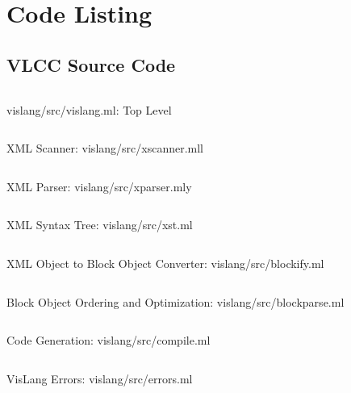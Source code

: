 \appendix
\section{Code Listing}
\subsection{VLCC Source Code}

\inputminted[frame=single,linenos,fontsize=\footnotesize]{ocaml}{../src/vislang.ml}
    {vislang/src/vislang.ml\label{src:top}: Top Level}

\inputminted[frame=single,linenos,fontsize=\footnotesize]{ocaml}{../src/xscanner.mll}
    {XML Scanner: vislang/src/xscanner.mll\label{src:scan}}

\inputminted[frame=single,linenos,fontsize=\footnotesize]{ocaml}{../src/xparser.mly}
    {XML Parser: vislang/src/xparser.mly\label{src:parse}}

\inputminted[frame=single,linenos,fontsize=\footnotesize]{ocaml}{../src/xst.ml}
    {XML Syntax Tree: vislang/src/xst.ml\label{src:xst}}

\inputminted[frame=single,linenos,fontsize=\footnotesize]{ocaml}{../src/blockify.ml}
    {XML Object to Block Object Converter: vislang/src/blockify.ml\label{src:blockify}}

\inputminted[frame=single,linenos,fontsize=\footnotesize]{ocaml}{../src/blockparse.ml}
    {Block Object Ordering and Optimization: vislang/src/blockparse.ml\label{src:xst}}

\inputminted[frame=single,linenos,fontsize=\footnotesize]{ocaml}{../src/compile.ml}
    {Code Generation: vislang/src/compile.ml\label{src:xst}}

\inputminted[frame=single,linenos,fontsize=\footnotesize]{ocaml}{../src/errors.ml}
    {VisLang Errors: vislang/src/errors.ml\label{src:xst}}
